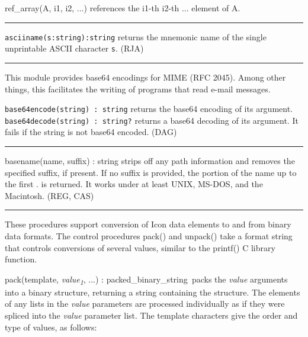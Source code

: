 \textsf{ref\_array(A, i1, i2, ...)} references the i1-th i2-th ...
element of A. 

\vspace{0.25cm}\hrule{}

\texttt{asciiname(s:string):string} returns the mnemonic name of the
single unprintable ASCII character \texttt{s}. (RJA)

\vspace{0.25cm}\hrule{}

This module provides base64 encodings for MIME (RFC 2045).
Among other things, this facilitates the writing of programs that read
e-mail messages.

\texttt{base64encode(string) : string} returns the base64 encoding of
its argument.\\
\texttt{base64decode(string) : string?} returns a base64 decoding of its
argument. It fails if the string is not base64 encoded. (DAG)

\vspace{0.25cm}\hrule{}

\textsf{basename}\textsf{(name, suffix) : string} strips
off any path information and removes the specified suffix, if present.
If no suffix is provided, the portion of the name up to the first
{\textquotedbl}.{\textquotedbl} is returned. It works under at least
UNIX, MS-DOS, and the Macintosh. (REG, CAS)

\vspace{0.25cm}\hrule{}

These procedures support conversion of Icon data elements
to and from binary data formats. The control procedures \textsf{pack()}
and \textsf{unpack()} take a format string that controls conversions of
several values, similar to the \textsf{printf()} C library function.

\textsf{pack(template,
}\textsf{\textit{value}}\textsf{\textit{\textsubscript{1}}}\textsf{,
...) : packed\_binary\_string}\texttt{ }packs the \textit{value}
arguments into a binary structure, returning a string containing the
structure. The elements of any lists in the \textit{value} parameters
are processed individually as if they were spliced into the
\textit{value} parameter list. The \textsf{template} characters give
the order and type of values, as follows:

